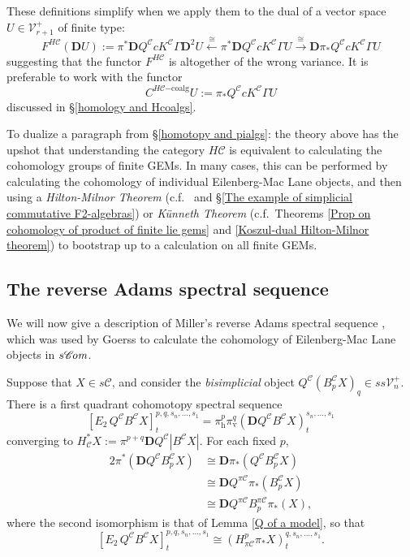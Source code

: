 \documentclass[11pt]{amsart} \renewcommand{\baselinestretch}{1.2}
\theoremstyle{plain}
\numberwithin{equation}{section} %
\theoremstyle{plain}
\numberwithin{equation}{chapter} %
\renewcommand{\to}{\longrightarrow}
\newcommand{\from}{\longleftarrow}
\newcommand{\scrC}{\mathscr{C}}
\newcommand{\calC}{\mathcal{C}}
\newcommand{\calV}{\mathcal{V}}
\newcommand{\calc}{\mathcal{C}}
\newcommand{\citeBOX}[2][]{\cite[\mbox{#1}]{#2}}
\newcommand{\vect}[2]{\calV^{#1}_{#2}}
\newcommand{\PA}[1]{\pi#1}
\newcommand{\HA}[1]{H#1}
\newcommand{\HC}[1]{H#1\mathrm{-coalg}}
\newcommand{\algs}{{\scrC\!\textit{\normalfont\textit{om}}}}
\newcommand{\Edown}[4]{[E_{#1}#2]^{#3}_{#4}}
\newcommand{\uver}{^\mathrm{v}}
\newcommand{\dver}{_\mathrm{v}}
\newcommand{\dhor}{_\mathrm{h}}
\newcommand{\diag}[1]{|#1|}
\newcommand{\dual}{\mathbf{D}}
\newcommand{\SubsectionOrSection}[1]{\subsection{#1}}
\begin{document}
\begin{Pi-algebras and cohomology algebras}
These definitions simplify when we apply them to the dual of a vector space $U\in\vect{+}{r+1}$ of finite type:
\[F^{\HA{\calc}}(\dual U):= \pi^*\dual Q^{\calc}cK^\calc\Gamma \dual^{2}U\overset{\cong}{\from}\pi^*\dual Q^{\calc}cK^\calc\Gamma U\overset{\cong}{\to} \dual  \pi_*Q^{\calc}cK^\calc\Gamma U\]
suggesting that the functor $F^{\HA{\calc}}$ is altogether of the wrong variance. It is preferable to work with the functor
\[C^{\HC{\calc}}U:=\pi_*Q^{\calc}cK^\calc\Gamma U\]
discussed in \S\ref{homology and Hcoalgs}.



To dualize a paragraph from \S\ref{homotopy and pialgs}: the theory above has the upshot that understanding the category $\HA{\calc}$ is equivalent to calculating the cohomology groups of finite GEMs. In many cases, this can be performed by calculating the cohomology of individual Eilenberg-Mac Lane objects, and then using a \emph{Hilton-Milnor Theorem} (c.f.\ \citeBOX[\S11]{MR1089001} and \S\ref{The example of simplicial commutative F2-algebras}) or \emph{K\"unneth Theorem} (c.f.\ Theorems \ref{Prop on cohomology of product of finite lie gems} and \ref{Koszul-dual Hilton-Milnor theorem}) to bootstrap up to a calculation on all finite GEMs.

\SubsectionOrSection{The reverse Adams spectral sequence}
\label{reverse Adams spectral sequence}
We will now give a description of Miller's reverse Adams spectral sequence \citeBOX[\S4]{MillerSullivanConjecture.pdf}, which was used by Goerss \cite[Chapter V]{MR1089001} to calculate the cohomology of Eilenberg-Mac Lane objects in $s\algs$.

Suppose that $X\in s\calC$, and consider the \emph{bisimplicial} object $Q^{\calc}(B^{\calc}_pX)_{q}\in ss\vect{+}{n}$. There is a first quadrant cohomotopy spectral sequence
\[\Edown{2}{\,Q^{\calc}B^{\calc}X}{p,q,s_n,\ldots,s_1}{t}=\pi\dhor^{p}\pi\dver^{q}(\dual Q^{\calc}B^{\calc}X)^{s_n,\ldots,s_1}_{t}\]
converging to $H^*_{\calc}X:=\pi^{p+q}\dual Q^{\calc}\diag{B^{\calc}X}$. For each fixed $p$, %
\begin{alignat*}{2}
\pi^{*}(\dual Q^{\calc}B^{\calc}_p X)&\cong\dual \pi_{*}(Q^{\calc}B^{\calc}_p X)\\
&\cong\dual Q^{\PA{\calc}}\pi_{*}(B^{\calc}_p X)\\
&\cong\dual Q^{\PA{\calc}}B^{\PA{\calc}}_p \pi_{*}(X),{}
\end{alignat*}
where the second isomorphism is that of Lemma \ref{Q of a model}, so that 
\[\Edown{2}{\,Q^{\calc}B^{\calc}X}{p,q,s_n,\ldots,s_1}{t}\cong (H^{p}_{\PA{\calc}}\pi_*X)^{q,s_n,\ldots,s_1}_{t}.\]


\end{Pi-algebras and cohomology algebras}
\end{document}
